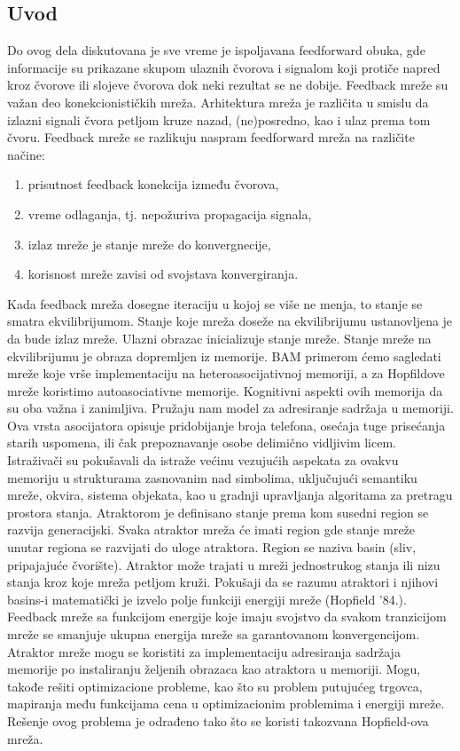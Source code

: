 \documentclass[fontsize=11bp, paper=a4]{scrarticle}
\begin{document}
\subsection{Uvod}
Do ovog dela diskutovana je sve vreme je ispoljavana feedforward obuka, gde informacije su prikazane skupom ulaznih čvorova i signalom koji protiče napred kroz čvorove ili slojeve čvorova dok neki rezultat se ne dobije. Feedback mreže su važan deo konekcionističkih mreža. Arhitektura mreža je različita u smislu da izlazni signali čvora petljom kruze nazad, (ne)posredno, kao i ulaz prema tom čvoru. Feedback mreže se razlikuju naspram feedforward mreža na različite načine:
\begin{enumerate}
    \item prisutnost feedback konekcija između čvorova,
    \item vreme odlaganja, tj. nepožuriva propagacija signala,
    \item izlaz mreže je stanje mreže do konvergnecije,
    \item korisnost mreže zavisi od svojstava konvergiranja.
\end{enumerate}
Kada feedback mreža dosegne iteraciju u kojoj se više ne menja, to stanje se smatra ekvilibrijumom. Stanje koje mreža doseže na ekvilibrijumu ustanovljena je da bude izlaz mreže. Ulazni obrazac inicializuje stanje mreže. Stanje mreže na ekvilibrijumu je obraza dopremljen iz memorije. BAM primerom ćemo sagledati mreže koje vrše implementaciju na heteroasocijativnoj memoriji, a za Hopfildove mreže koristimo autoasociativne memorije.
Kognitivni aspekti ovih memorija da su oba važna i zanimljiva. Pružaju nam model za adresiranje sadržaja u memoriji. Ova vrsta asocijatora opisuje pridobijanje broja telefona, osećaja tuge prisećanja starih uspomena, ili čak prepoznavanje osobe delimično vidljivim licem. Istraživači su pokušavali da istraže većinu vezujućih aspekata za ovakvu memoriju u strukturama zasnovanim nad simbolima, uključujući semantiku mreže, okvira, sistema objekata, kao u gradnji upravljanja algoritama za pretragu prostora stanja\cite{statespace}.
Atraktorom je definisano stanje prema kom susedni region se razvija generacijski. Svaka atraktor mreža će imati region gde stanje mreže unutar regiona se razvijati do uloge atraktora. Region se naziva basin (sliv, pripajajuće čvorište). Atraktor može trajati u mreži jednostrukog stanja ili nizu stanja kroz koje mreža petljom kruži. Pokušaji da se razumu atraktori i njihovi basins-i matematički je izvelo polje funkciji energiji mreže (Hopfield '84.). Feedback mreže sa funkcijom energije koje imaju svojstvo da svakom tranzicijom mreže se smanjuje ukupna energija mreže sa garantovanom konvergencijom. Atraktor mreže mogu se koristiti za implementaciju adresiranja sadržaja memorije po instaliranju željenih obrazaca kao atraktora u memoriji. Mogu, takođe rešiti optimizacione probleme, kao što su problem putujućeg trgovca, mapiranja među funkcijama cena u optimizacionim problemima i energiji mreže. Rešenje ovog problema je odrađeno tako što se koristi takozvana Hopfield-ova mreža.
\end{document}
